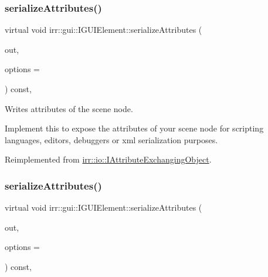 \subsubsection{\texorpdfstring{serialize\+Attributes()}{serializeAttributes()}\hspace{0.1cm}{\footnotesize\ttfamily [1/2]}}
{\footnotesize\ttfamily virtual void irr\+::gui\+::\+I\+G\+U\+I\+Element\+::serialize\+Attributes (\begin{DoxyParamCaption}\item[{\hyperlink{classirr_1_1io_1_1IAttributes}{io\+::\+I\+Attributes} $\ast$}]{out,  }\item[{\hyperlink{structirr_1_1io_1_1SAttributeReadWriteOptions}{io\+::\+S\+Attribute\+Read\+Write\+Options} $\ast$}]{options = {} }\end{DoxyParamCaption}) const\hspace{0.3cm}{\ttfamily [inline]}, {\ttfamily [virtual]}}



Writes attributes of the scene node. 

Implement this to expose the attributes of your scene node for scripting languages, editors, debuggers or xml serialization purposes. 

Reimplemented from \hyperlink{classirr_1_1io_1_1IAttributeExchangingObject_a587f7b633366968f0488e1099e9172ef}{irr\+::io\+::\+I\+Attribute\+Exchanging\+Object}.

\mbox{\label{classirr_1_1gui_1_1IGUIElement_ac575f2f817b05733dbc667ff298f6e78}} 
\subsubsection{\texorpdfstring{serialize\+Attributes()}{serializeAttributes()}\hspace{0.1cm}{\footnotesize\ttfamily [2/2]}}
{\footnotesize\ttfamily virtual void irr\+::gui\+::\+I\+G\+U\+I\+Element\+::serialize\+Attributes (\begin{DoxyParamCaption}\item[{\hyperlink{classirr_1_1io_1_1IAttributes}{io\+::\+I\+Attributes} $\ast$}]{out,  }\item[{\hyperlink{structirr_1_1io_1_1SAttributeReadWriteOptions}{io\+::\+S\+Attribute\+Read\+Write\+Options} $\ast$}]{options = {} }\end{DoxyParamCaption}) const\hspace{0.3cm}{\ttfamily [inline]}, {\ttfamily [virtual]}}



